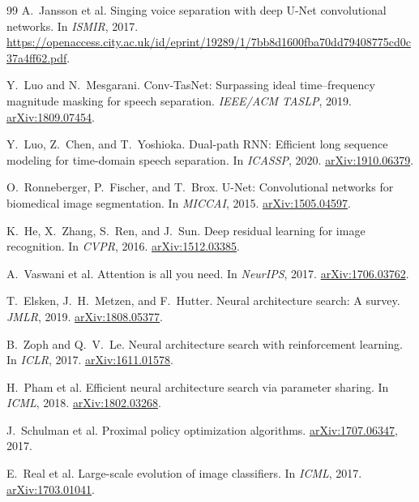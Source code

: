 \documentclass[10pt,twocolumn,letterpaper]{article}
\begin{document}
{\begin{thebibliography}{99}
A.~Jansson et al.
\newblock Singing voice separation with deep U-Net convolutional networks.
\newblock In \emph{ISMIR}, 2017.
\newblock \url{https://openaccess.city.ac.uk/id/eprint/19289/1/7bb8d1600fba70dd79408775cd0c37a4ff62.pdf}.

Y.~Luo and N.~Mesgarani.
\newblock Conv-TasNet: Surpassing ideal time--frequency magnitude masking for speech separation.
\newblock \emph{IEEE/ACM TASLP}, 2019.
\newblock \href{https://arxiv.org/abs/1809.07454}{arXiv:1809.07454}.

Y.~Luo, Z.~Chen, and T.~Yoshioka.
\newblock Dual-path RNN: Efficient long sequence modeling for time-domain speech separation.
\newblock In \emph{ICASSP}, 2020.
\newblock \href{https://arxiv.org/abs/1910.06379}{arXiv:1910.06379}.

O.~Ronneberger, P.~Fischer, and T.~Brox.
\newblock U-Net: Convolutional networks for biomedical image segmentation.
\newblock In \emph{MICCAI}, 2015.
\newblock \href{https://arxiv.org/abs/1505.04597}{arXiv:1505.04597}.

K.~He, X.~Zhang, S.~Ren, and J.~Sun.
\newblock Deep residual learning for image recognition.
\newblock In \emph{CVPR}, 2016.
\newblock \href{https://arxiv.org/abs/1512.03385}{arXiv:1512.03385}.

A.~Vaswani et al.
\newblock Attention is all you need.
\newblock In \emph{NeurIPS}, 2017.
\newblock \href{https://arxiv.org/abs/1706.03762}{arXiv:1706.03762}.

T.~Elsken, J.~H.~Metzen, and F.~Hutter.
\newblock Neural architecture search: A survey.
\newblock \emph{JMLR}, 2019.
\newblock \href{https://arxiv.org/abs/1808.05377}{arXiv:1808.05377}.

B.~Zoph and Q.~V.~Le.
\newblock Neural architecture search with reinforcement learning.
\newblock In \emph{ICLR}, 2017.
\newblock \href{https://arxiv.org/abs/1611.01578}{arXiv:1611.01578}.

H.~Pham et al.
\newblock Efficient neural architecture search via parameter sharing.
\newblock In \emph{ICML}, 2018.
\newblock \href{https://arxiv.org/abs/1802.03268}{arXiv:1802.03268}.

J.~Schulman et al.
\newblock Proximal policy optimization algorithms.
\newblock \href{https://arxiv.org/abs/1707.06347}{arXiv:1707.06347}, 2017.

E.~Real et al.
\newblock Large-scale evolution of image classifiers.
\newblock In \emph{ICML}, 2017.
\newblock \href{https://arxiv.org/abs/1703.01041}{arXiv:1703.01041}.


\end{thebibliography}}
\end{document}

